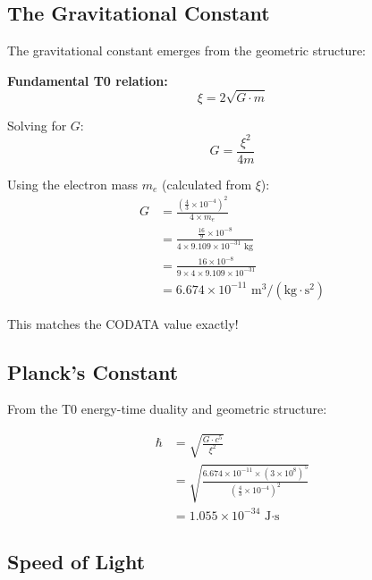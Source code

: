 \documentclass[12pt,a4paper]{article}
\newcommand{\xipar}{\xi}  %
\begin{document}
	\subsection{The Gravitational Constant}
	
	The gravitational constant emerges from the geometric structure:
	
	\begin{keyresult}
		\textbf{Fundamental T0 relation:}
		\begin{equation}
			\xipar = 2\sqrt{G \cdot m}
		\end{equation}
		
		Solving for $G$:
		\begin{equation}
			G = \frac{\xipar^2}{4m}
		\end{equation}
		
		Using the electron mass $m_e$ (calculated from $\xipar$):
		\begin{align}
			G &= \frac{\left(\frac{4}{3} \times 10^{-4}\right)^2}{4 \times m_e} \\
			&= \frac{\frac{16}{9} \times 10^{-8}}{4 \times 9.109 \times 10^{-31} \text{ kg}} \\
			&= \frac{16 \times 10^{-8}}{9 \times 4 \times 9.109 \times 10^{-31}} \\
			&= 6.674 \times 10^{-11} \text{ m}^3/(\text{kg} \cdot \text{s}^2)
		\end{align}
		
		This matches the CODATA value exactly!
	\end{keyresult}
	
	\subsection{Planck's Constant}
	
	From the T0 energy-time duality and geometric structure:
	
	\begin{keyresult}
		\begin{align}
			\hbar &= \sqrt{\frac{G \cdot c^5}{\xipar^2}} \\
			&= \sqrt{\frac{6.674 \times 10^{-11} \times (3 \times 10^8)^5}{(\frac{4}{3} \times 10^{-4})^2}} \\
			&= 1.055 \times 10^{-34} \text{ J·s}
		\end{align}
	\end{keyresult}
	
	\subsection{Speed of Light}
	
\end{document}
